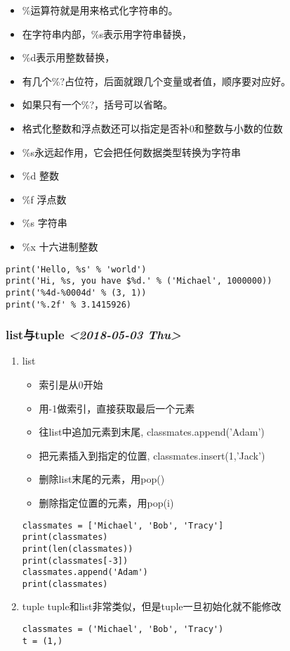 \documentclass[11pt]{article}
\begin{document}
\begin{itemize}
\item \%运算符就是用来格式化字符串的。
\item 在字符串内部，\%s表示用字符串替换，
\item \%d表示用整数替换，
\item 有几个\%?占位符，后面就跟几个变量或者值，顺序要对应好。
\item 如果只有一个\%?，括号可以省略。
\item 格式化整数和浮点数还可以指定是否补0和整数与小数的位数
\item \%s永远起作用，它会把任何数据类型转换为字符串

\item \%d	整数
\item \%f	浮点数
\item \%s	字符串
\item \%x	十六进制整数
\end{itemize}

\begin{verbatim}
print('Hello, %s' % 'world')
print('Hi, %s, you have $%d.' % ('Michael', 1000000))
print('%4d-%0004d' % (3, 1))
print('%.2f' % 3.1415926)
\end{verbatim}
\subsubsection{list与tuple \textit{<2018-05-03 Thu>}}
\label{sec:orgd7cdd9f}
\begin{enumerate}
\item list
\label{sec:orgba0fc88}
\begin{itemize}
\item 索引是从0开始
\item 用-1做索引，直接获取最后一个元素
\item 往list中追加元素到末尾, classmates.append('Adam')
\item 把元素插入到指定的位置, classmates.insert(1,'Jack')
\item 删除list末尾的元素，用pop()
\item 删除指定位置的元素，用pop(i)
\end{itemize}
\begin{verbatim}
classmates = ['Michael', 'Bob', 'Tracy']
print(classmates)
print(len(classmates))
print(classmates[-3])
classmates.append('Adam')
print(classmates)
\end{verbatim}
\item tuple
\label{sec:orgac0af53}
tuple和list非常类似，但是tuple一旦初始化就不能修改
\begin{verbatim}
classmates = ('Michael', 'Bob', 'Tracy')
t = (1,)
\end{verbatim}
\end{enumerate}
\end{document}

